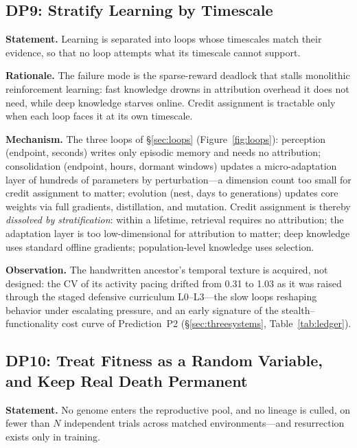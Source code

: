 \documentclass[11pt,a4paper]{article}
\begin{document}
\subsection{DP9: Stratify Learning by Timescale}
\label{dp:loops}

\noindent\textbf{Statement.} Learning is separated into loops whose timescales match their evidence, so that no loop attempts what its timescale cannot support.

\noindent\textbf{Rationale.} The failure mode is the sparse-reward deadlock that stalls monolithic reinforcement learning: fast knowledge drowns in attribution overhead it does not need, while deep knowledge starves online. Credit assignment is tractable only when each loop faces it at its own timescale.

\noindent\textbf{Mechanism.} The three loops of \S\ref{sec:loops} (Figure~\ref{fig:loops}): perception (endpoint, seconds) writes only episodic memory and needs no attribution; consolidation (endpoint, hours, dormant windows) updates a micro-adaptation layer of hundreds of parameters by perturbation---a dimension count too small for credit assignment to matter; evolution (nest, days to generations) updates core weights via full gradients, distillation, and mutation. Credit assignment is thereby \emph{dissolved by stratification}: within a lifetime, retrieval requires no attribution; the adaptation layer is too low-dimensional for attribution to matter; deep knowledge uses standard offline gradients; population-level knowledge uses selection.

\noindent\textbf{Observation.} The handwritten ancestor's temporal texture is acquired, not designed: the CV of its activity pacing drifted from 0.31 to 1.03 as it was raised through the staged defensive curriculum L0--L3---the slow loops reshaping behavior under escalating pressure, and an early signature of the stealth--functionality cost curve of Prediction~P2 (\S\ref{sec:threesystems}, Table~\ref{tab:ledger}).

\subsection{DP10: Treat Fitness as a Random Variable, and Keep Real Death Permanent}
\label{dp:fitness}\label{sec:nrepeat}\label{sec:curriculum}

\noindent\textbf{Statement.} No genome enters the reproductive pool, and no lineage is culled, on fewer than $N$ independent trials across matched environments---and resurrection exists only in training.
\end{document}
